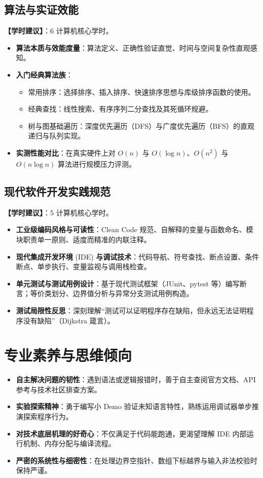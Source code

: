 \subsection{算法与实证效能}
\textbf{【学时建议】}：6 计算机核心学时。

\begin{itemize}
    \item \textbf{算法本质与效能度量}：算法定义、正确性验证直觉、时间与空间复杂性直观感知。
    \item \textbf{入门经典算法族}：
    \begin{itemize}
        \item 常用排序：选择排序、插入排序、快速排序思想与库级排序函数的使用。
        \item 经典查找：线性搜索、有序序列二分查找及其死循环规避。
        \item 树与图基础遍历：深度优先遍历（DFS）与广度优先遍历（BFS）的直观递归与队列实现。
    \end{itemize}
    \item \textbf{实测性能对比}：在真实硬件上对 $O(n)$ 与 $O(\log n)$、$O(n^2)$ 与 $O(n \log n)$ 算法进行规模压力评测。
\end{itemize}

\subsection{现代软件开发实践规范}
\textbf{【学时建议】}：5 计算机核心学时。

\begin{itemize}
    \item \textbf{工业级编码风格与可读性}：Clean Code 规范、自解释的变量与函数命名、模块职责单一原则、适度而精准的内联注释。
    \item \textbf{现代集成开发环境} (IDE) \textbf{与调试技术}：代码导航、符号查找、断点设置、条件断点、单步执行、变量监视与调用栈检查。
    \item \textbf{单元测试与测试用例设计}：基于现代测试框架（JUnit、pytest 等）编写断言；等价类划分、边界值分析与异常分支测试用例构造。
    \item \textbf{测试局限性反思}：深刻理解“测试可以证明程序存在缺陷，但永远无法证明程序没有缺陷”（Dijkstra 箴言）。
\end{itemize}

\section{专业素养与思维倾向}

\begin{itemize}
    \item \textbf{自主解决问题的韧性}：遇到语法或逻辑报错时，善于自主查阅官方文档、API 参考与技术社区排查方案。
    \item \textbf{实验探索精神}：勇于编写小 Demo 验证未知语言特性，熟练运用调试器单步推演探索程序行为。
    \item \textbf{对技术底层机理的好奇心}：不仅满足于代码能跑通，更渴望理解 IDE 内部运行机制、内存分配与编译流程。
    \item \textbf{严密的系统性与细密性}：在处理边界空指针、数组下标越界与输入非法校验时保持严谨。
\end{itemize}

